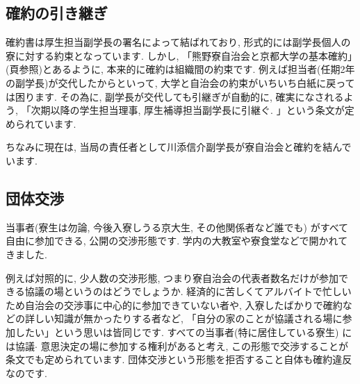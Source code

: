 \documentclass[10pt,b5jsbook,dvips,dvipdfmx,openany]{jsbook}
\theoremstyle{definition}
\begin{document}
		\subsection{確約の引き継ぎ}
		確約書は厚生担当副学長の署名によって結ばれており, 形式的には副学長個人の寮に対する約束となっています. しかし, 「熊野寮自治会と京都大学の基本確約」(\pageref{page:確約}頁参照)とあるように, 本来的に確約は組織間の約束です. 例えば担当者(任期2年の副学長)が交代したからといって, 大学と自治会の約束がいちいち白紙に戻っては困ります. その為に, 副学長が交代しても引継ぎが自動的に, 確実になされるよう, 「次期以降の学生担当理事, 厚生補導担当副学長に引継ぐ. 」という条文が定められています. 

		ちなみに現在は, 当局の責任者として川添信介副学長が寮自治会と確約を結んでいます. 

		\subsection{団体交渉}
		当事者(寮生は勿論, 今後入寮しうる京大生, その他関係者など誰でも) がすべて自由に参加できる, 公開の交渉形態です. 学内の大教室や寮食堂などで開かれてきました. 

		例えば対照的に, 少人数の交渉形態, つまり寮自治会の代表者数名だけが参加できる協議の場というのはどうでしょうか. 経済的に苦しくてアルバイトで忙しいため自治会の交渉事に中心的に参加できていない者や, 入寮したばかりで確約などの詳しい知識が無かったりする者など, 「自分の家のことが協議される場に参加したい」という思いは皆同じです. すべての当事者(特に居住している寮生) には協議$ \cdot $ 意思決定の場に参加する権利があると考え, この形態で交渉することが条文でも定められています. 団体交渉という形態を拒否すること自体も確約違反なのです. 

		\label{page:確約}
\end{document}
